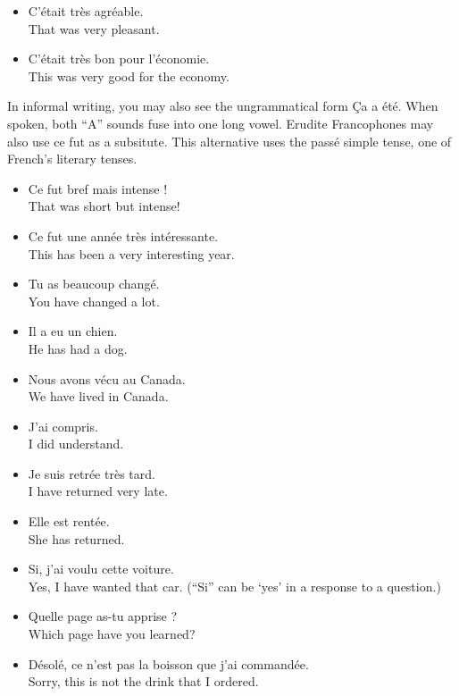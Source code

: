\begin{itemize}
  \item  C'{\'e}tait tr{\`e}s agr{\'e}able. \\ That was very pleasant.
	\item  C'{\'e}tait tr{\`e}s bon pour l'{\'e}conomie. \\ This was very good for the economy.
\end{itemize}

In informal writing, you may also see the ungrammatical form Ça a {\'e}t{\'e}. When spoken, both ``A'' sounds fuse into one long vowel. Erudite Francophones may also use ce fut as a subsitute. This alternative uses the pass{\'e} simple tense, one of French's literary tenses.

\begin{itemize}
  \item  Ce fut bref mais intense ! \\ That was short but intense!
	\item  Ce fut une ann{\'e}e tr{\`e}s int{\'e}ressante. \\ This has been a very interesting year.
\end{itemize}

\begin{itemize}
  \item  Tu as beaucoup chang{\'e}. \\ You have changed a lot.
	\item  Il a eu un chien. \\ He has had a dog. 
	\item  Nous avons v{\'e}cu au Canada. \\ We have lived in Canada.
	\item  J'ai compris. \\ I did understand.
	\item  Je suis retr{\'e}e tr{\`e}s tard. \\ I have returned very late.
	\item  Elle est rent{\'e}e. \\ She has returned.
	\item  Si, j'ai voulu cette voiture. \\ Yes, I have wanted that car. (``Si'' can be `yes' in a response to a question.)
	\item  Quelle page as-tu apprise ? \\ Which page have you learned?
	\item  D{\'e}sol{\'e}, ce n'est pas la boisson que j'ai command{\'e}e. \\ Sorry, this is not the drink that I ordered.
\end{itemize}

